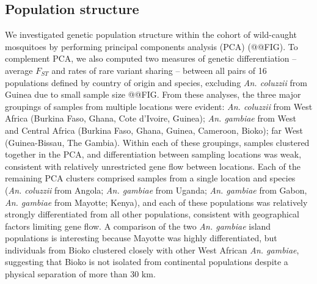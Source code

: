 \documentclass[a4paper,11pt,abstracton,hidelinks]{scrartcl}
\begin{document}
\subsection*{Population structure}


%
We investigated genetic population structure within the cohort of wild-caught mosquitoes by performing principal components analysis (PCA) (@@FIG).
%
To complement PCA, we also computed two measures of genetic differentiation -- average $F_{ST}$ and rates of rare variant sharing -- between all pairs of 16 populations defined by country of origin and species, excluding \textit{An. coluzzii} from Guinea due to small sample size @@FIG.
%
From these analyses, the three major groupings of samples from multiple locations were evident: \textit{An. coluzzii} from West Africa (Burkina Faso, Ghana, Cote d'Ivoire, Guinea); \textit{An. gambiae} from West and Central Africa (Burkina Faso, Ghana, Guinea, Cameroon, Bioko); far West (Guinea-Bissau, The Gambia). 
%
Within each of these groupings, samples clustered together in the PCA, and differentiation between sampling locations was weak, consistent with relatively unrestricted gene flow between locations.
%
Each of the remaining PCA clusters comprised samples from a single location and species (\textit{An. coluzzii} from Angola; \textit{An. gambiae} from Uganda; \textit{An. gambiae} from Gabon, \textit{An. gambiae} from Mayotte; Kenya), and each of these populations was relatively strongly differentiated from all other populations, consistent with geographical factors limiting gene flow.
%
A comparison of the two \textit{An. gambiae} island populations is interesting because Mayotte was highly differentiated, but individuals from Bioko clustered closely with other West African \textit{An. gambiae}, suggesting that Bioko is not isolated from continental populations despite a physical separation of more than 30 km.
\end{document}
